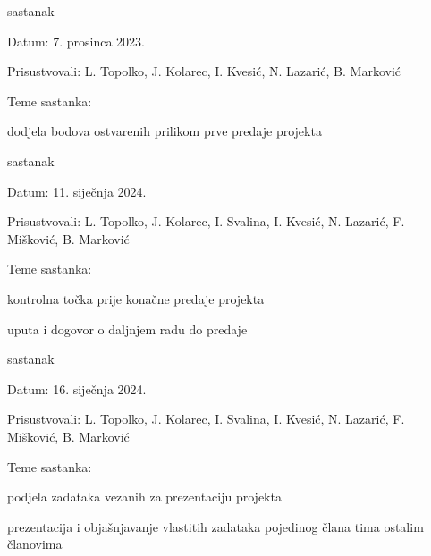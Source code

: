 \begin{packed_enum}
			
			\item  sastanak
			\item[] \begin{packed_item}
				\item Datum: 7. prosinca 2023.
				\item Prisustvovali: L. Topolko, J. Kolarec, I. Kvesić, N. Lazarić, B. Marković
				\item Teme sastanka:
				\begin{packed_item}
					\item dodjela bodova ostvarenih prilikom prve predaje projekta
				\end{packed_item}
			\end{packed_item}
			
			
			
			\item  sastanak
			\item[] \begin{packed_item}
				\item Datum: 11. siječnja 2024.
				\item Prisustvovali: L. Topolko, J. Kolarec, I. Svalina, I. Kvesić, N. Lazarić, F. Mišković, B. Marković
				\item Teme sastanka:
				\begin{packed_item}
					\item kontrolna točka prije konačne predaje projekta
					\item uputa i dogovor o daljnjem radu do predaje 
				\end{packed_item}
			\end{packed_item}
			
			
			\item  sastanak
			\item[] \begin{packed_item}
				\item Datum: 16. siječnja 2024.
				\item Prisustvovali: L. Topolko, J. Kolarec, I. Svalina, I. Kvesić, N. Lazarić, F. Mišković, B. Marković
				\item Teme sastanka:
				\begin{packed_item}
					\item podjela zadataka vezanih za prezentaciju projekta
					\item prezentacija i objašnjavanje vlastitih zadataka pojedinog člana tima ostalim članovima 
				\end{packed_item}
			\end{packed_item}
			
		
		
		\end{packed_enum}
		
